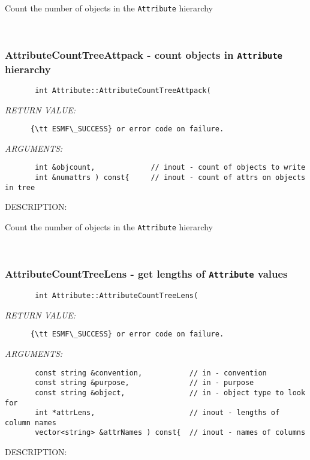        Count the number of objects in the {\tt Attribute} hierarchy 
  
 
\mbox{}\hrulefill\
 
\subsubsection [AttributeCountTreeAttpack] {AttributeCountTreeAttpack - count objects in {\tt Attribute} hierarchy }


  
\begin{verbatim}       int Attribute::AttributeCountTreeAttpack(
   \end{verbatim}{\em RETURN VALUE:}
\begin{verbatim}      {\tt ESMF\_SUCCESS} or error code on failure.
   \end{verbatim}{\em ARGUMENTS:}
\begin{verbatim}       int &objcount,             // inout - count of objects to write
       int &numattrs ) const{     // inout - count of attrs on objects in tree
   \end{verbatim}
{\sf DESCRIPTION:\\ }


       Count the number of objects in the {\tt Attribute} hierarchy 
  
 
\mbox{}\hrulefill\
 
\subsubsection [AttributeCountTreeLens] {AttributeCountTreeLens - get lengths of {\tt Attribute} values}


  
\begin{verbatim}       int Attribute::AttributeCountTreeLens(
   \end{verbatim}{\em RETURN VALUE:}
\begin{verbatim}      {\tt ESMF\_SUCCESS} or error code on failure.
   \end{verbatim}{\em ARGUMENTS:}
\begin{verbatim}       const string &convention,           // in - convention
       const string &purpose,              // in - purpose
       const string &object,               // in - object type to look for
       int *attrLens,                      // inout - lengths of column names
       vector<string> &attrNames ) const{  // inout - names of columns
   \end{verbatim}
{\sf DESCRIPTION:\\ }



